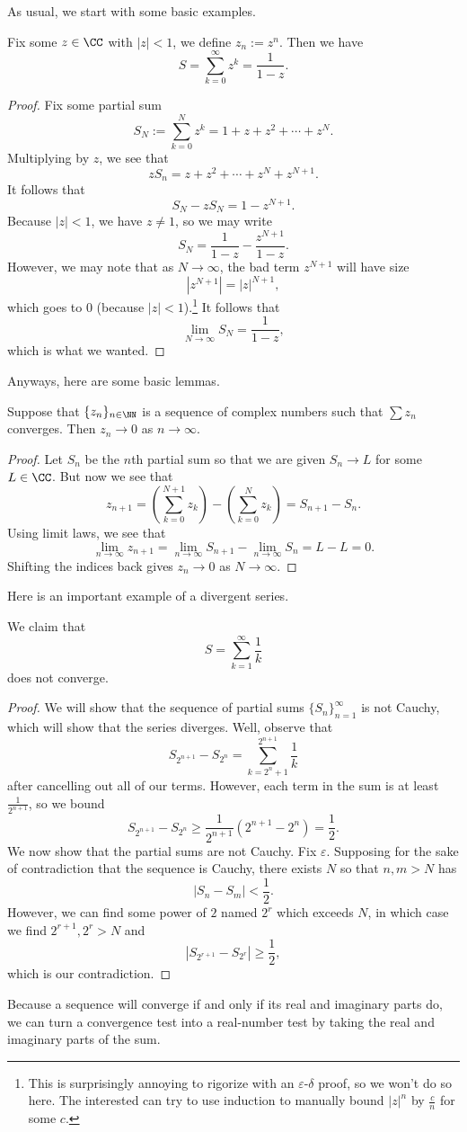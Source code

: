As usual, we start with some basic examples.
\begin{exe}
	Fix some $z\in\CC$ with $|z|<1$, we define $z_n:=z^n$. Then we have
	\[S=\sum_{k=0}^\infty z^k=\frac1{1-z}.\]
\end{exe}
\begin{proof}
	Fix some partial sum
	\[S_N:=\sum_{k=0}^Nz^k=1+z+z^2+\cdots+z^N.\]
	Multiplying by $z$, we see that
	\[zS_n=z+z^2+\cdots+ z^N+z^{N+1}.\]
	It follows that
	\[S_N-zS_N=1-z^{N+1}.\]
	Because $|z|<1$, we have $z\ne1$, so we may write
	\[S_N=\frac1{1-z}-\frac{z^{N+1}}{1-z}.\]
	However, we may note that as $N\to\infty$, the bad term $z^{N+1}$ will have size
	\[\left|z^{N+1}\right|=|z|^{N+1},\]
	which goes to $0$ (because $|z|<1$).\footnote{This is surprisingly annoying to rigorize with an $\varepsilon$-$\delta$ proof, so we won't do so here. The interested can try to use induction to manually bound $|z|^n$ by $\frac cn$ for some $c$.} It follows that
	\[\lim_{N\to\infty}S_N=\frac1{1-z},\]
	which is what we wanted.
\end{proof}
Anyways, here are some basic lemmas.
\begin{lemma} \label{lem:divtest}
	Suppose that $\{z_n\}_{n\in\NN}$ is a sequence of complex numbers such that $\sum z_n$ converges. Then $z_n\to0$ as $n\to\infty$.
\end{lemma}
\begin{proof}
	Let $S_n$ be the $n$th partial sum so that we are given $S_n\to L$ for some $L\in\CC$. But now we see that
	\[z_{n+1}=\left(\sum_{k=0}^{N+1}z_k\right)-\left(\sum_{k=0}^{N}z_k\right)=S_{n+1}-S_n.\]
	Using limit laws, we see that
	\[\lim_{n\to\infty}z_{n+1}=\lim_{n\to\infty}S_{n+1}-\lim_{n\to\infty}S_n=L-L=0.\]
	Shifting the indices back gives $z_n\to0$ as $N\to\infty$.
\end{proof}
Here is an important example of a divergent series.
\begin{exe}
	We claim that
	\[S=\sum_{k=1}^\infty\frac1k\]
	does not converge.
\end{exe}
\begin{proof}
	We will show that the sequence of partial sums $\{S_n\}_{n=1}^\infty$ is not Cauchy, which will show that the series diverges. Well, observe that
	\[S_{2^{n+1}}-S_{2^n}=\sum_{k=2^n+1}^{2^{n+1}}\frac1k\]
	after cancelling out all of our terms. However, each term in the sum is at least $\frac1{2^{n+1}}$, so we bound
	\[S_{2^{n+1}}-S_{2^n}\ge\frac1{2^{n+1}}\left(2^{n+1}-2^n\right)=\frac12.\]
	We now show that the partial sums are not Cauchy. Fix $\varepsilon$. Supposing for the sake of contradiction that the sequence is Cauchy, there exists $N$ so that $n,m>N$ has
	\[|S_n-S_m|<\frac12.\]
	However, we can find some power of $2$ named $2^r$ which exceeds $N$, in which case we find $2^{r+1},2^r>N$ and
	\[|S_{2^{r+1}}-S_{2^r}|\ge\frac12,\]
	which is our contradiction.
\end{proof}
\begin{remark}
	Because a sequence will converge if and only if its real and imaginary parts do, we can turn a convergence test into a real-number test by taking the real and imaginary parts of the sum.
\end{remark}

